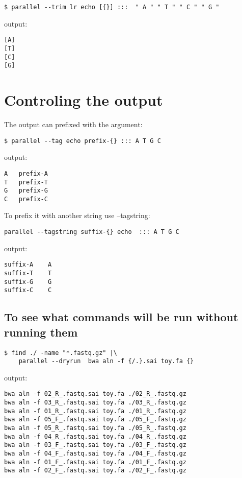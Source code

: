 \documentclass{article}
\begin{document}
\begin{lstlisting}
$ parallel --trim lr echo [{}] :::  " A " " T " " C " " G "
\end{lstlisting}
output:
\begin{lstlisting}
[A]
[T]
[C]
[G]
\end{lstlisting}

\section{Controling the output}
The output can prefixed with the argument:
\begin{lstlisting}
$ parallel --tag echo prefix-{} ::: A T G C
\end{lstlisting}
output:
\begin{lstlisting}
A	prefix-A
T	prefix-T
G	prefix-G
C	prefix-C
\end{lstlisting}

To prefix it with another string use --tagstring:
\begin{lstlisting}
parallel --tagstring suffix-{} echo  ::: A T G C
\end{lstlisting}
output:
\begin{lstlisting}
suffix-A	A
suffix-T	T
suffix-G	G
suffix-C	C
\end{lstlisting}

\subsection{To see what commands will be run without running them}
\begin{lstlisting}
$ find ./ -name "*.fastq.gz" |\
	parallel --dryrun  bwa aln -f {/.}.sai toy.fa {}
\end{lstlisting}
output:
\begin{lstlisting}
bwa aln -f 02_R_.fastq.sai toy.fa ./02_R_.fastq.gz
bwa aln -f 03_R_.fastq.sai toy.fa ./03_R_.fastq.gz
bwa aln -f 01_R_.fastq.sai toy.fa ./01_R_.fastq.gz
bwa aln -f 05_F_.fastq.sai toy.fa ./05_F_.fastq.gz
bwa aln -f 05_R_.fastq.sai toy.fa ./05_R_.fastq.gz
bwa aln -f 04_R_.fastq.sai toy.fa ./04_R_.fastq.gz
bwa aln -f 03_F_.fastq.sai toy.fa ./03_F_.fastq.gz
bwa aln -f 04_F_.fastq.sai toy.fa ./04_F_.fastq.gz
bwa aln -f 01_F_.fastq.sai toy.fa ./01_F_.fastq.gz
bwa aln -f 02_F_.fastq.sai toy.fa ./02_F_.fastq.gz
\end{lstlisting}
\end{document}
